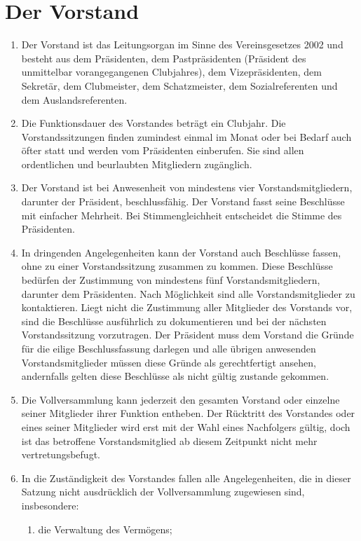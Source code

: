 \documentclass{article}
\begin{document}
\section{Der Vorstand}
\begin{enumerate}
    \item Der Vorstand ist das Leitungsorgan im Sinne des Vereinsgesetzes 2002 und besteht aus dem Präsidenten, dem Pastpräsidenten (Präsident des unmittelbar vorangegangenen Clubjahres), dem Vizepräsidenten, dem Sekretär, dem Clubmeister, dem Schatzmeister, dem Sozialreferenten und dem Auslandsreferenten.
    \item Die Funktionsdauer des Vorstandes beträgt ein Clubjahr. Die Vorstandssitzungen finden zumindest einmal im Monat oder bei Bedarf auch öfter statt und werden vom Präsidenten einberufen. Sie sind allen ordentlichen und beurlaubten Mitgliedern zugänglich.
    \item Der Vorstand ist bei Anwesenheit von mindestens vier Vorstandsmitgliedern, darunter der Präsident, beschlussfähig. Der Vorstand fasst seine Beschlüsse mit einfacher Mehrheit. Bei Stimmengleichheit entscheidet die Stimme des Präsidenten.
    \item In dringenden Angelegenheiten kann der Vorstand auch Beschlüsse fassen, ohne zu einer Vorstandssitzung zusammen zu kommen. Diese Beschlüsse bedürfen der Zustimmung von mindestens fünf Vorstandsmitgliedern, darunter dem Präsidenten. Nach Möglichkeit sind alle Vorstandsmitglieder zu kontaktieren. Liegt nicht die Zustimmung aller Mitglieder des Vorstands vor, sind die Beschlüsse ausführlich zu dokumentieren und bei der nächsten Vorstandssitzung vorzutragen. Der Präsident muss dem Vorstand die Gründe für die eilige Beschlussfassung darlegen und alle übrigen anwesenden Vorstandsmitglieder müssen diese Gründe als gerechtfertigt ansehen, andernfalls gelten diese Beschlüsse als nicht gültig zustande gekommen.
    \item Die Vollversammlung kann jederzeit den gesamten Vorstand oder einzelne seiner Mitglieder ihrer Funktion entheben. Der Rücktritt des Vorstandes oder eines seiner Mitglieder wird erst mit der Wahl eines Nachfolgers gültig, doch ist das betroffene Vorstandsmitglied ab diesem Zeitpunkt nicht mehr vertretungsbefugt.
    \item In die Zuständigkeit des Vorstandes fallen alle Angelegenheiten, die in dieser Satzung nicht ausdrücklich der Vollversammlung zugewiesen sind, insbesondere:
    \begin{enumerate}
        \item die Verwaltung des Vermögens;

\end{enumerate}
\end{enumerate}
\end{document}
